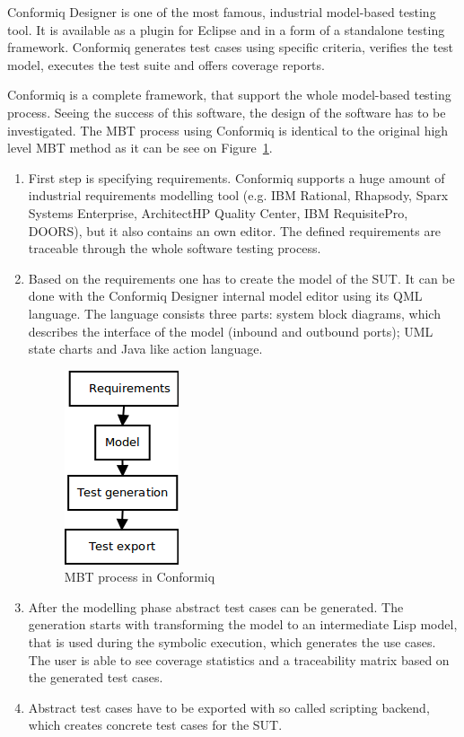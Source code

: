Conformiq Designer \cite{conformiq}\cite{conformiqweb} is one of the most famous, industrial model-based testing tool. It is available as a plugin for Eclipse and in a form of a standalone testing framework. Conformiq generates test cases using specific criteria, verifies the test model, executes the test suite and offers coverage reports.

Conformiq is a complete framework, that support the whole model-based testing process. Seeing the success of this software, the design of the software has to be investigated. The MBT process using Conformiq is identical to the original high level MBT method as it can be see on Figure~\ref{fig:conformiq_process}.

\begin{enumerate}
	\item First step is specifying requirements. Conformiq supports a huge amount of industrial requirements modelling tool (e.g. IBM Rational, Rhapsody, Sparx Systems Enterprise, ArchitectHP Quality Center, IBM RequisitePro, DOORS), but it also contains an own editor. The defined requirements are traceable through the whole software testing process.
	\item Based on the requirements one has to create the model of the SUT. It can be done with the Conformiq Designer internal model editor using its QML language. The language consists three parts: system block diagrams, which describes the interface of the model (inbound and outbound ports); UML state charts and Java like action language.
	
\begin{figure}[htp]
\centering
\includegraphics[scale=0.6]{figures/conformiq_process.png}
\caption{MBT process in Conformiq}
\label{fig:conformiq_process}
\end{figure}
	
	\item After the modelling phase abstract test cases can be generated. The generation starts with transforming the model to an intermediate Lisp model, that is used during the symbolic execution, which generates the use cases. The user is able to see coverage statistics and a traceability matrix based on the generated test cases.
	\item Abstract test cases have to be exported with so called scripting backend, which creates concrete test cases for the SUT.
\end{enumerate}

